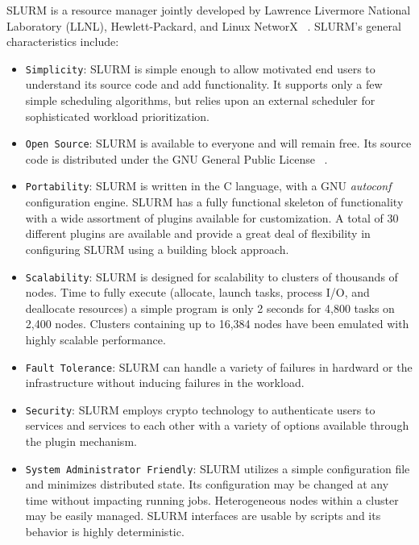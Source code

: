\documentclass{../common/acm}
\begin{document}
SLURM is a resource manager jointly developed by Lawrence
Livermore National Laboratory (LLNL),
Hewlett-Packard, and Linux NetworX
~\cite{SLURM2003,Yoo2003,SlurmWeb}.
SLURM's general characteristics include:

\begin{itemize}
\item {\tt Simplicity}: SLURM is simple enough to allow motivated
end users to understand its source code and add functionality.
It supports only a few simple scheduling algorithms,
but relies upon an external scheduler for sophisticated
workload prioritization.

\item {\tt Open Source}: SLURM is available to everyone and
will remain free.
Its source code is distributed under the GNU General Public
License
~\cite{GPL2002}.

\item {\tt Portability}: SLURM is written in the C language,
with a GNU {\em autoconf} configuration engine.
SLURM has a fully functional skeleton of functionality with a
wide assortment of plugins available for customization.
A total of 30 different plugins are available and provide a
great deal of flexibility in configuring SLURM using a
building block approach.

\item {\tt Scalability}: SLURM is designed for scalability to clusters
of thousands of nodes. Time to fully execute (allocate, launch
tasks, process I/O, and deallocate resources) a simple program
is only 2 seconds for 4,800 tasks on 2,400 nodes. Clusters
containing up to 16,384 nodes have been emulated with highly
scalable performance.

\item {\tt Fault Tolerance}: SLURM can handle a variety of failures
in hardward or the infrastructure without inducing failures in
the workload.

\item {\tt Security}: SLURM employs crypto technology to authenticate
users to services and services to each other with a variety of options
available through the plugin mechanism.

\item {\tt System Administrator Friendly}: SLURM utilizes
a simple configuration file and minimizes distributed state.
Its configuration may be changed at any time without impacting running
jobs.  Heterogeneous nodes within a cluster may be easily managed.  SLURM
interfaces are usable by scripts and its behavior is highly deterministic.

\end{itemize}
\end{document}
